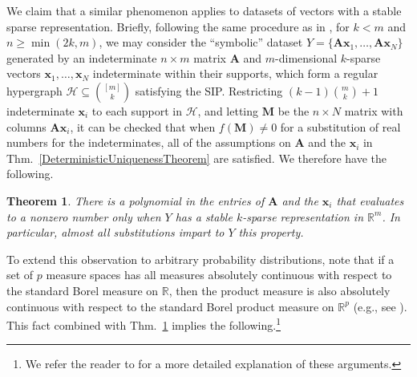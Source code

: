 \documentclass[journal, twocolumn]{IEEEtran}
\newtheorem{theorem}{Theorem}
\begin{document}
We claim that a similar phenomenon applies to datasets of vectors with a stable sparse representation. Briefly, following the same procedure as in \cite[Sec.~IV]{Hillar15}, for $k < m$ and $n \geq \min(2k, m)$, we may consider the ``symbolic'' dataset $Y = \{\mathbf{A}\mathbf{x}_1,\ldots,\mathbf{A} \mathbf{x}_N\}$ generated by an indeterminate $n \times m$ matrix $\mathbf{A}$ and $m$-dimensional $k$-sparse vectors $\mathbf{x}_1, \ldots, \mathbf{x}_N$ indeterminate within their supports, which form a regular hypergraph $\mathcal{H} \subseteq {[m] \choose k}$ satisfying the SIP. Restricting \mbox{$(k-1){m \choose k} + 1$} indeterminate $\mathbf{x}_i$ to each support in $\mathcal{H}$, and letting $\textbf{M}$ be the $n \times N$ matrix with columns $\mathbf{A}\mathbf{x}_i$, it can be checked that when $f(\mathbf{M}) \neq 0$ for a substitution of real numbers for the indeterminates, all of the assumptions on $\mathbf{A}$ and the $\mathbf{x}_i$ in Thm.~\ref{DeterministicUniquenessTheorem} are satisfied. We therefore have the following.  %

\begin{theorem}\label{robustPolythm}
There is a polynomial in the entries of $\mathbf{A}$ and the $\mathbf{x}_i$ that evaluates to a nonzero number only when $Y$ has a stable $k$-sparse representation in $\mathbb{R}^m$. In particular, almost all substitutions impart to $Y$ this property.
\end{theorem}

To extend this observation to arbitrary probability distributions, note that if a set of $p$ measure spaces has all measures absolutely continuous with respect to the standard Borel measure on $\mathbb{R}$, then the product measure is also absolutely continuous with respect to the standard Borel product measure on $\mathbb{R}^p$ (e.g., see \cite{folland2013real}).  This fact combined with Thm.~\ref{robustPolythm} implies the following.\footnote{We refer the reader to \cite{Hillar15} for a more detailed explanation of these arguments.}
\end{document}
